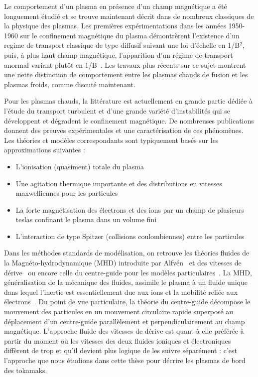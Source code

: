 \begin{refsection}
Le comportement d'un plasma en présence d'un champ magnétique a été
longuement étudié et se trouve maintenant décrit dans de nombreux classiques de
la physique des plasmas.
Les premières expérimentations dans les années 1950-1960 sur le confinement
magnétique du plasma démontrèrent l'existence d'un regime de transport classique
de type diffusif suivant une loi d'échelle en 1/B$^2$, puis, à plus haut champ
magnétique, l'apparition d'un régime de transport anormal variant plutôt en
1/B~\parencite{Bohm,Simon55,Yoshikawa,Janes,Rozhansky}. Les travaux plus
récents sur ce sujet montrent une nette distinction de
comportement entre les plasmas chauds de fusion et les plasmas froids, comme
discuté maintenant.

Pour les plasmas chauds, la littérature est actuellement en grande partie dédiée
à l'étude du transport turbulent et d'une grande variété d'instabilités qui
se développent et dégradent le confinement magnétique. De nombreuses
publications donnent des preuves expérimentales et une caractérisation de ces
phénomènes. Les théories et modèles correspondants sont typiquement basés sur
les approximations suivantes :

\begin{itemize}
  \item L'ionisation (quasiment) totale du plasma
  \item Une agitation thermique importante et des distributions en
  vitesses maxwelliennes pour les particules
  \item La forte magnétisation des électrons et des ions par un champ de
  plusieurs teslas confinant le plasma dans un volume fini
  \item L'interaction de type Spitzer (collisions coulombiennes) entre les
  particules
\end{itemize}

Dans les méthodes standards de modélisation, on retrouve les théories fluides de
la Magnéto-hydrodynamique
 (MHD) introduite
par Alfvén~\parencite{Alfven} et des vitesses de dérive~\parencite{SarazinPhD}
ou encore celle du centre-guide pour les modèles
particulaires~\parencite{Taylor,Lee,Garbet10}.
La MHD, généralisation de la mécanique des fluides, assimile le plasma à un fluide unique dans lequel
l'inertie est essentiellement due aux ions et la mobilité reliée aux
électrons~\parencite{Rax}. Du point de vue particulaire, la
théorie du centre-guide décompose le mouvement des particules en un mouvement
circulaire rapide superposé au déplacement d'un centre-guide parallèlement et
perpendiculairement au champ magnétique. L'approche fluide des vitesses de
dérive est quant à elle préférée à partir du moment où les vitesses des deux fluides
ioniques et électroniques diffèrent de trop et qu'il devient plus logique de les
suivre séparément : c'est l'approche que nous étudions dans cette thèse pour
décrire les plasmas de bord des tokamaks.


\end{refsection}

